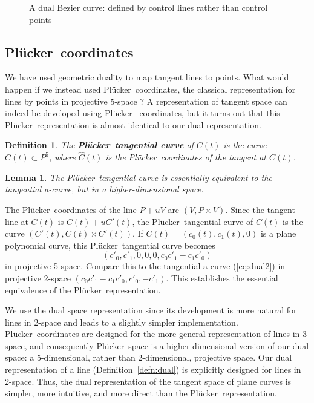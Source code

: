 \documentclass[12pt]{article}
\newcommand{\QED}{\vrule height 1.4ex width 1.0ex depth -.1ex\ \vspace{.3in}} %
\newcommand{\prf}{\noindent{{\bf Proof}:\ \ \ }}
\newtheorem{lemma}[theorem]{Lemma}
\newtheorem{defn2}[theorem]{Definition}
\newcommand{\plucker}{Pl\"{u}cker\ }
\begin{document}
\begin{figure}
\centerline{}
\caption{A dual Bezier curve: defined by control lines rather than control points}
\label{fig:Hoschekdual}
\end{figure}


\subsection{\plucker coordinates}
\label{sec:plucker}

We have used geometric duality to map tangent lines to points.
What would happen if we instead used \plucker coordinates,
the classical representation for lines
by points in projective 5-space \cite{bottemaRoth79}? 	%
A representation of tangent space can indeed be developed using \plucker
coordinates, but it turns out that this \plucker representation is almost 
identical to our dual representation.

\begin{defn2}
The {\bf \plucker tangential curve} of $C(t)$ is the curve $\hat{C}(t) \subset P^5$,
where $\hat{C}(t)$ is the \plucker coordinates of the tangent at $C(t)$.
\end{defn2}

\begin{lemma}
The \plucker tangential curve is essentially equivalent to the tangential a-curve,
but in a higher-dimensional space.
\end{lemma}
\prf
The \plucker coordinates of the line $P+uV$ are $(V,P \times V)$.
Since the tangent line at $C(t)$ is $C(t) + uC'(t)$,
the \plucker tangential curve of $C(t)$
is the curve $(C'(t), C(t) \times C'(t))$.
If $C(t) = (c_0(t),c_1(t),0)$ is a plane polynomial curve,
this \plucker tangential curve becomes
\[
	(c'_0, c'_1, 0, 0, 0, c_0c'_1 - c_1c'_0)
\]
in projective 5-space.
Compare this to the tangential a-curve (\ref{eq:dual2}) in projective 2-space
$(c_0c'_1 - c_1c'_0, c'_0, -c'_1)$.
This establishes the essential equivalence of the \plucker representation.
\QED

We use the dual space representation since its development is more natural
for lines in 2-space and leads to a slightly simpler implementation.
\plucker coordinates are designed for the more general representation
of lines in 3-space,
and consequently \plucker space is a higher-dimensional version of our dual space:
a 5-dimensional, rather than 2-dimensional, projective space.
Our dual representation of a line (Definition~\ref{defn:dual})
is explicitly designed for lines in 2-space.
Thus, the dual representation of the tangent space of plane curves is simpler, more intuitive, and 
more direct than the \plucker representation.
\end{document}
